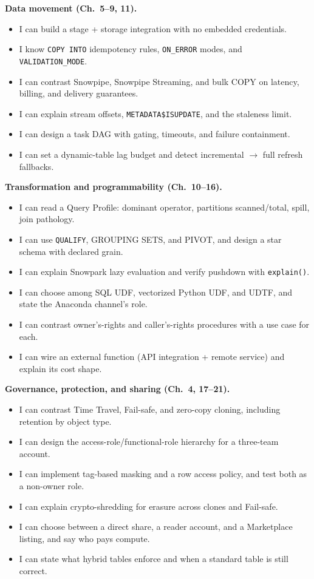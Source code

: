\textbf{Data movement (Ch.~5--9, 11).}
\begin{itemize}
    \item[$\square$] I can build a stage + storage integration with no embedded credentials.
    \item[$\square$] I know \texttt{COPY INTO} idempotency rules, \texttt{ON\_ERROR} modes, and \texttt{VALIDATION\_MODE}.
    \item[$\square$] I can contrast Snowpipe, Snowpipe Streaming, and bulk COPY on latency, billing, and delivery guarantees.
    \item[$\square$] I can explain stream offsets, \texttt{METADATA\$ISUPDATE}, and the staleness limit.
    \item[$\square$] I can design a task DAG with gating, timeouts, and failure containment.
    \item[$\square$] I can set a dynamic-table lag budget and detect incremental $\rightarrow$ full refresh fallbacks.
\end{itemize}

\textbf{Transformation and programmability (Ch.~10--16).}
\begin{itemize}
    \item[$\square$] I can read a Query Profile: dominant operator, partitions scanned/total, spill, join pathology.
    \item[$\square$] I can use \texttt{QUALIFY}, GROUPING SETS, and PIVOT, and design a star schema with declared grain.
    \item[$\square$] I can explain Snowpark lazy evaluation and verify pushdown with \texttt{explain()}.
    \item[$\square$] I can choose among SQL UDF, vectorized Python UDF, and UDTF, and state the Anaconda channel's role.
    \item[$\square$] I can contrast owner's-rights and caller's-rights procedures with a use case for each.
    \item[$\square$] I can wire an external function (API integration + remote service) and explain its cost shape.
\end{itemize}

\textbf{Governance, protection, and sharing (Ch.~4, 17--21).}
\begin{itemize}
    \item[$\square$] I can contrast Time Travel, Fail-safe, and zero-copy cloning, including retention by object type.
    \item[$\square$] I can design the access-role/functional-role hierarchy for a three-team account.
    \item[$\square$] I can implement tag-based masking and a row access policy, and test both as a non-owner role.
    \item[$\square$] I can explain crypto-shredding for erasure across clones and Fail-safe.
    \item[$\square$] I can choose between a direct share, a reader account, and a Marketplace listing, and say who pays compute.
    \item[$\square$] I can state what hybrid tables enforce and when a standard table is still correct.
\end{itemize}

